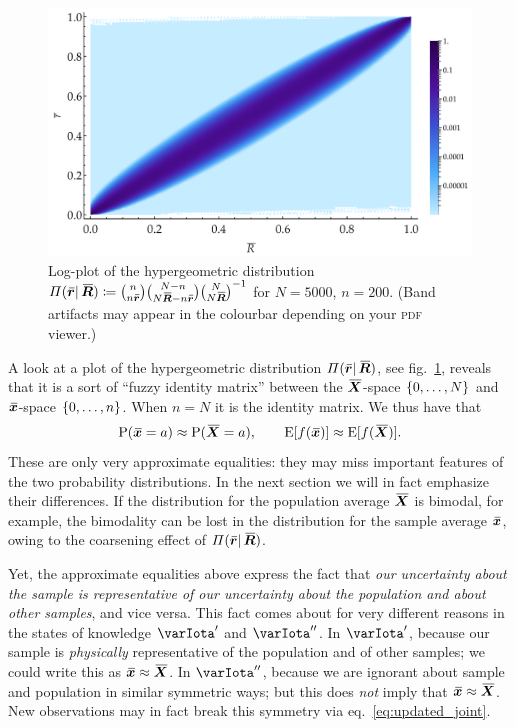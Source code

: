\documentclass{article}
\theoremstyle{remark}
\theoremstyle{innote}
\newcommand*{\defd}{\coloneqq}
\renewcommand*{\|}{\mathpunct{|}}%
\DeclarePairedDelimiter\clcl{[}{]}
\DeclarePairedDelimiter\set{\{}{\}}
\newcommand*{\p}{\mathrm{P}}%
\newcommand*{\eqn}{eq.}%
\newcommand*{\fig}{fig.}%
\newcommand*{\E}{\mathrm{E}}
\newcommand*{\expeb}{\E\clcl}%
\theoremstyle{simple}
\newcommand*{\widebar}[1]{{\mkern1.5mu\skew{2}\overline{\mkern-1.5mu#1\mkern-1.5mu}\mkern 1.5mu}}
\newcommand*{\av}{\widebar} %
\newcommand*{\sav}{\widebar} %
\newcommand*{\ypp}{\varPi}
\newcommand*{\yxx}{x}%
\newcommand*{\yx}{\bm{\yxx}}%
\newcommand*{\yxs}{\sav{\yx}}%
\newcommand*{\yX}{\bm{X}}%
\newcommand*{\yXf}{\av{\yX}}%
\newcommand*{\yr}{\bm{r}}%
\newcommand*{\yrs}{\sav{\yr}}%
\newcommand*{\yR}{\bm{R}}%
\newcommand*{\yRf}{\av{\yR}}%
\newcommand*{\yH}{\varIota}
\newcommand*{\yHp}{\varIota'}
\newcommand*{\yHi}{\varIota''}
\begin{document}
\begin{figure}[!t]
\centering
\includegraphics[width=0.9\linewidth]{pop_sample_projection3.pdf}%
\caption{Log-plot of the hypergeometric distribution
  $%
\ypp(\yrs\|\yRf) \defd  \raisebox{0pt}[0pt][1ex]{}\binom{n}{n\yrs}\binom{N-n}{N \yRf-n\yrs}\binom{N}{N \yRf}^{-1}$ for $N=5000$, $n=200$. (Band artifacts may appear in the
  colourbar depending on your \textsc{pdf} viewer.)}
\label{fig:hypergeom_proj}
\end{figure}%
A look at a plot of the hypergeometric distribution $\ypp(\yrs\|\yRf)$, see
\fig~\ref{fig:hypergeom_proj}, reveals that it is a sort of \enquote{fuzzy
  identity matrix} between the $\yXf$-space $\set{0,\dotsc,N}$ and
$\yxs$-space $\set{0,\dotsc,n}$. When $n=N$ it is the identity matrix. We
thus have that
\begin{equation}
  \label{eq:roughly_equal_nN}
  \p(\yxs=a) \approx \p(\yXf=a),\qquad
\expeb{f(\yxs)} \approx \expeb{f(\yXf)}.
\end{equation}
These are only very approximate equalities: they may miss important
features of the two probability distributions. In the next section we will
in fact emphasize their differences. If the distribution for the population
average $\yXf$ is bimodal, for example, the bimodality can be lost in the
distribution for the sample average $\yxs$, owing to the coarsening effect
of $\ypp(\yrs\|\yRf)$.

Yet, the approximate equalities above express the fact that \emph{our
  uncertainty about the sample is representative of our uncertainty about
  the population and about other samples}, and vice versa. This fact comes
about for very different reasons in the states of knowledge $\yHp$ and
$\yHi$. In $\yHp$, because our sample is \emph{physically} representative
of the population and of other samples; we could write this as
$\yxs\approx\yXf$. In $\yHi$, because we are ignorant about sample and
population in similar symmetric ways; but this does \emph{not} imply that
$\yxs\approx\yXf$. New observations may in fact break this symmetry via
\eqn~\eqref{eq:updated_joint}.
\end{document}
